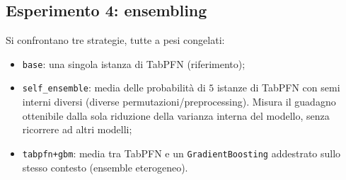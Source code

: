 \documentclass[11pt,a4paper]{article}
\begin{document}
\subsection{Esperimento 4: ensembling}
\label{sec:exp-ensemble}
Si confrontano tre strategie, tutte a pesi congelati:
\begin{itemize}[nosep]
  \item \texttt{base}: una singola istanza di TabPFN (riferimento);
  \item \texttt{self\_ensemble}: media delle probabilità di $5$ istanze di
  TabPFN con semi interni diversi (diverse permutazioni/preprocessing). Misura il
  guadagno ottenibile dalla sola riduzione della varianza interna del modello,
  senza ricorrere ad altri modelli;
  \item \texttt{tabpfn+gbm}: media tra TabPFN e un \texttt{GradientBoosting}
  addestrato sullo stesso contesto (ensemble eterogeneo).
\end{itemize}
\end{document}
